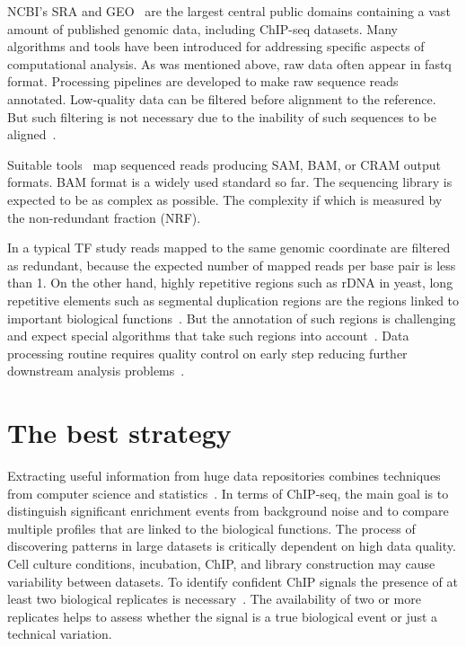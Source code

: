 NCBI's SRA and GEO~\cite{barrett2012ncbi} are the largest central public domains containing a vast amount of published genomic data, including ChIP-seq datasets. 
Many algorithms and tools have been introduced for addressing specific aspects of computational analysis. 
As was mentioned above, raw data often appear in fastq format. 
Processing pipelines are developed to make raw sequence reads annotated.
Low-quality data can be filtered before alignment to the reference. 
But such filtering is not necessary due to the inability of such sequences to be aligned~\cite{furey2012chip}.

Suitable tools~\cite{langmead2009ultrafast, li2009fast, kim2019graph} map sequenced reads producing  SAM, BAM, or CRAM output formats. 
BAM format is a widely used standard so far.
The sequencing library is expected to be as complex as possible. 
The complexity if which is measured by the non-redundant fraction (NRF).

In a typical TF study reads mapped to the same genomic coordinate are filtered as redundant, because the expected number of mapped reads per base pair is less than 1. 
On the other hand, highly repetitive regions such as rDNA in yeast, long repetitive elements such as segmental duplication regions are the regions linked to important biological functions~\cite{nakato2017recent}. But the annotation of such regions is challenging and expect special algorithms that take such regions into account~\cite{chung2011discovering}.
Data processing routine requires quality control on early step reducing further downstream analysis problems~\cite{ewels2016multiqc}.

\section{The best strategy}
\label{strategy}

Extracting useful information from huge data repositories combines techniques from computer science and statistics~\cite{friedman2001elements}. 
In terms of ChIP-seq, the main goal is to distinguish significant enrichment events from background noise and to compare multiple profiles that are linked to the biological functions. 
The process of discovering patterns in large datasets is critically dependent on high data quality. 
Cell culture conditions, incubation, ChIP, and library construction may cause variability between datasets. 
To identify confident ChIP signals the presence of at least two biological replicates is necessary~\cite{kidder2011chip}. 
The availability of two or more replicates helps to assess whether the signal is a true biological event or just a technical variation. 


